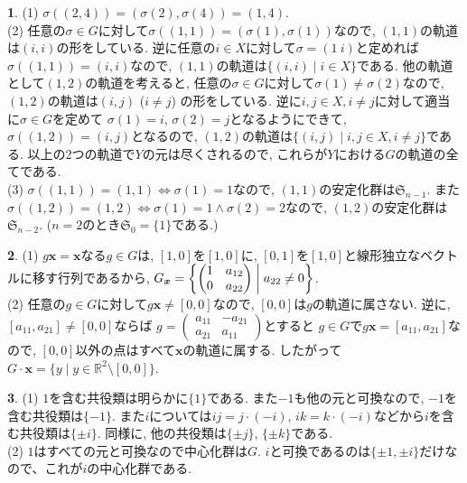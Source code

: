 \documentclass{amsart}
\theoremstyle{definition}
\newtheorem{ans}{}
\numberwithin{ans}{subsection}
\begin{document}
\begin{ans}
  (1) $\sigma((2, 4)) = (\sigma(2), \sigma(4)) = (1, 4)$.\\
  (2) 任意の$\sigma \in G$に対して$\sigma((1, 1)) = (\sigma(1), \sigma(1))$なので,
  $(1, 1)$の軌道は$(i, i)$の形をしている. 逆に任意の$i \in X$に対して$\sigma = (1\ i)$と定めれば
  $\sigma((1, 1)) = (i, i)$なので, $(1, 1)$の軌道は$\{(i, i) \mid i \in X\}$である.
  他の軌道として$(1, 2)$の軌道を考えると, 任意の$\sigma \in G$に対して$\sigma(1) \neq \sigma(2)$なので,
  $(1, 2)$の軌道は$(i, j)$ ($i \neq j$) の形をしている. 逆に$i, j \in X, i \neq j$に対して適当に$\sigma \in G$を定めて
  $\sigma(1) = i$, $\sigma(2) = j$となるようにできて,$\sigma((1, 2)) = (i, j)$となるので,
  $(1, 2)$の軌道は$\{(i, j) \mid i, j \in X, i \neq j\}$である.
  以上の$2$つの軌道で$Y$の元は尽くされるので, これらが$Y$における$G$の軌道の全てである.\\
  (3) $\sigma((1, 1)) = (1, 1) \Longleftrightarrow \sigma(1) = 1$なので, $(1, 1)$の安定化群は$\mathfrak{S}_{n-1}$.
  また$\sigma((1, 2)) = (1, 2) \Longleftrightarrow \sigma(1) = 1 \land \sigma(2) = 2$なので, $(1, 2)$の安定化群は$\mathfrak{S}_{n-2}$.
  ($n = 2$のとき$\mathfrak{S}_0 = \{1\}$である.)
\end{ans}

\begin{ans}
  (1) $g\bm{x} = \bm{x}$なる$g \in G$は, $[1, 0]$を$[1, 0]$に, $[0, 1]$を$[1, 0]$と線形独立なベクトルに移す行列であるから,
  $G_{\bm{x}} = \biggl\{\begin{pmatrix*}
    1 & a_{12}\\
    0 & a_{22}
  \end{pmatrix*} \biggm\vert a_{22} \neq 0\biggr\}$.\\
  (2) 任意の$g \in G$に対して$g\bm{x} \neq [0, 0]$なので,
  $[0, 0]$は$g$の軌道に属さない.
  逆に, $[a_{11}, a_{21}] \neq [0, 0]$ならば
  $g = \begin{pmatrix*}
    a_{11} & -a_{21}\\
    a_{21} & a_{11}
  \end{pmatrix*}$とすると
  $g \in G$で$g\bm{x} = [a_{11}, a_{21}]$なので,
  $[0, 0]$以外の点はすべて$\bm{x}$の軌道に属する.
  したがって$G \cdot \bm{x} = \{y \mid y \in \mathbb{R}^2\setminus[0, 0]\}$.
\end{ans}

\begin{ans}
  (1) $1$を含む共役類は明らかに$\{1\}$である.
  また$-1$も他の元と可換なので, $-1$を含む共役類は$\{-1\}$.
  また$i$については$ij = j \cdot (-i)$, $ik = k \cdot (-i)$などから$i$を含む共役類は$\{\pm i\}$.
  同様に, 他の共役類は$\{\pm j\}$, $\{\pm k\}$である.\\
  (2) $1$はすべての元と可換なので中心化群は$G$.
  $i$と可換であるのは$\{\pm 1, \pm i\}$だけなので、これが$i$の中心化群である.
\end{ans}
\end{document}
